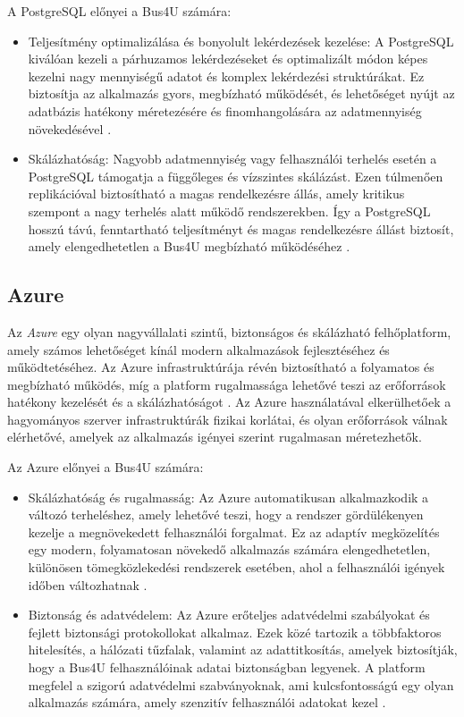 A PostgreSQL előnyei a Bus4U számára: \begin{itemize} \item Teljesítmény optimalizálása és bonyolult lekérdezések kezelése: A PostgreSQL kiválóan kezeli a párhuzamos lekérdezéseket és optimalizált módon képes kezelni nagy mennyiségű adatot és komplex lekérdezési struktúrákat. Ez biztosítja az alkalmazás gyors, megbízható működését, és lehetőséget nyújt az adatbázis hatékony méretezésére és finomhangolására az adatmennyiség növekedésével \cite{murrell_postgresql}. \item Skálázhatóság: Nagyobb adatmennyiség vagy felhasználói terhelés esetén a PostgreSQL támogatja a függőleges és vízszintes skálázást. Ezen túlmenően replikációval biztosítható a magas rendelkezésre állás, amely kritikus szempont a nagy terhelés alatt működő rendszerekben. Így a PostgreSQL hosszú távú, fenntartható teljesítményt és magas rendelkezésre állást biztosít, amely elengedhetetlen a Bus4U megbízható működéséhez \cite{douglas_postgresql}. \end{itemize}

\subsection{Azure}
Az \textit{Azure} egy olyan nagyvállalati szintű, biztonságos és skálázható felhőplatform, amely számos lehetőséget kínál modern alkalmazások fejlesztéséhez és működtetéséhez. Az Azure infrastruktúrája révén biztosítható a folyamatos és megbízható működés, míg a platform rugalmassága lehetővé teszi az erőforrások hatékony kezelését és a skálázhatóságot \cite{wilder_azure, collier_azure}. Az Azure használatával elkerülhetőek a hagyományos szerver infrastruktúrák fizikai korlátai, és olyan erőforrások válnak elérhetővé, amelyek az alkalmazás igényei szerint rugalmasan méretezhetők.

Az Azure előnyei a Bus4U számára:

\begin{itemize} 
    \item Skálázhatóság és rugalmasság: Az Azure automatikusan alkalmazkodik a változó terheléshez, amely lehetővé teszi, hogy a rendszer gördülékenyen kezelje a megnövekedett felhasználói forgalmat. Ez az adaptív megközelítés egy modern, folyamatosan növekedő alkalmazás számára elengedhetetlen, különösen tömegközlekedési rendszerek esetében, ahol a felhasználói igények időben változhatnak \cite{wilder_azure}.
    \item Biztonság és adatvédelem: Az Azure erőteljes adatvédelmi szabályokat és fejlett biztonsági protokollokat alkalmaz. Ezek közé tartozik a többfaktoros hitelesítés, a hálózati tűzfalak, valamint az adattitkosítás, amelyek biztosítják, hogy a Bus4U felhasználóinak adatai biztonságban legyenek. A platform megfelel a szigorú adatvédelmi szabványoknak, ami kulcsfontosságú egy olyan alkalmazás számára, amely szenzitív felhasználói adatokat kezel \cite{collier_azure}.
\end{itemize}


